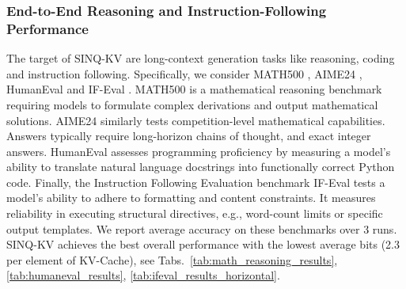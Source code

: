 \documentclass{llmxive}
\providecommand{\methodname}{SINQ-KV\xspace}
\begin{document}
\subsubsection{End-to-End Reasoning and Instruction-Following Performance}
The target of \methodname are long-context generation tasks like reasoning, coding and instruction following. Specifically, we consider MATH500 \cite{lightman2024lets_math500}, AIME24 \cite{aime24}, HumanEval \cite{chen2021evaluating_humaneval} and IF-Eval \cite{zhou2023instructionfollowingevaluationlargelanguage_ifeval}. MATH500 is a mathematical reasoning benchmark requiring models to formulate complex derivations and output mathematical solutions.  AIME24 similarly tests competition-level mathematical capabilities. Answers typically require long-horizon chains of thought, and exact integer answers. HumanEval assesses programming proficiency by measuring a model's ability to translate natural language docstrings into functionally correct Python code. Finally, the Instruction Following Evaluation benchmark IF-Eval tests a model's ability to  adhere to formatting and content constraints. It measures reliability in executing structural directives, e.g., word-count limits or specific output templates. We report average accuracy on these benchmarks over 3 runs. \methodname achieves the best overall performance with the lowest average bits (2.3 per element of KV-Cache), see Tabs.~\ref{tab:math_reasoning_results}, \ref{tab:humaneval_results}, \ref{tab:ifeval_results_horizontal}.
\end{document}
